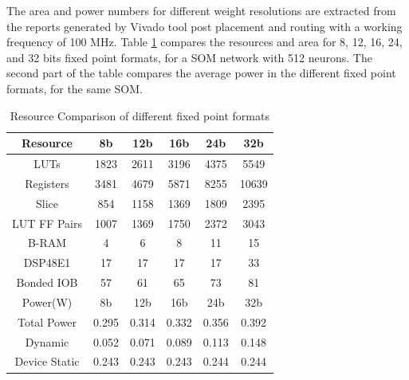 \documentclass[a4paper,10pt]{article}
\begin{document}
The area and power numbers for different weight resolutions are extracted from the reports generated by Vivado tool post placement and routing with a working frequency of 100 MHz. Table \ref{table:1} compares the resources and area for 8, 12, 16, 24, and 32 bits fixed point formats, for a SOM network with 512 neurons. The second part of the table compares the average power in the different fixed point formats, for the same SOM.
\begin{table}[!htb]
	\centering
	\caption{Resource Comparison of different fixed point formats}
	\label{table:1}
	\begin{tabular}{ c |c | c| c |c | c } 
		\toprule
		Resource & 8b & 12b & 16b & 24b & 32b \\ 
		\midrule
		LUTs & 1823 & 2611 &3196 & 4375 & 5549 \\
		\hline
		Registers & 3481 & 4679 & 5871 & 8255 & 10639 \\ 
		\hline
		Slice & 854 & 1158 & 1369 &1809 & 2395 \\ 
		\hline
		LUT FF Pairs & 1007 & 1369 & 1750 & 2372 & 3043 \\
		\hline
		B-RAM & 4 & 6 & 8 & 11 & 15 \\
		\hline
		DSP48E1 & 17 & 17 & 17 & 17 & 33 \\
		\hline
		Bonded IOB & 57 & 61 & 65 & 73 & 81 \\
		\midrule
	
		\midrule
		Power(W) & 8b & 12b & 16b & 24b & 32b \\ 
		\midrule
		Total Power & 0.295 &0.314 &0.332 &0.356 &0.392 \\
		\hline
		Dynamic &0.052 &0.071 &0.089 &0.113 &0.148 \\ 
		\hline
		Device Static &0.243 &0.243 &0.243 &0.244 &0.244 \\ 
		\bottomrule
	\end{tabular}
\end{table}
\end{document}
